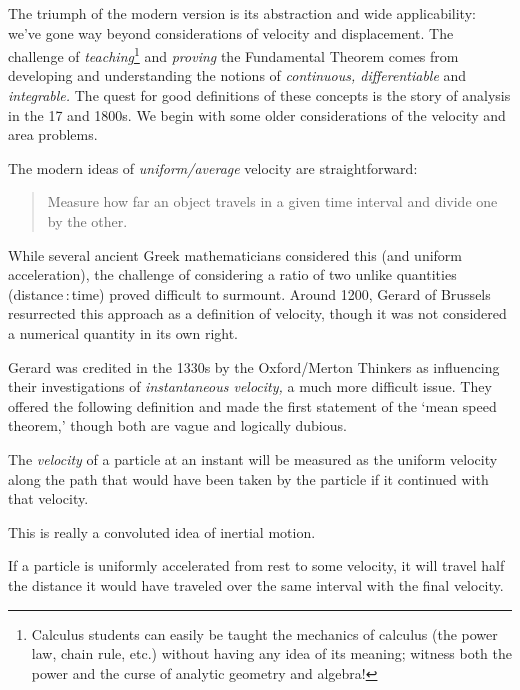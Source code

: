 The triumph of the modern version is its abstraction and wide applicability: we've gone way beyond considerations of velocity and displacement. The challenge of \emph{teaching}\footnote{Calculus students can easily be taught the mechanics of calculus (the power law, chain rule, etc.) without having any idea of its meaning; witness both the power and the curse of analytic geometry and algebra!} and \emph{proving} the Fundamental Theorem comes from developing and understanding the notions of \emph{continuous, differentiable} and \emph{integrable.} The quest for good definitions of these concepts is the story of analysis in the 17 and 1800s. We begin with some older considerations of the velocity and area problems.



The modern ideas of \emph{uniform/average} velocity are straightforward:
\begin{quote}
Measure how far an object travels in a given time interval and divide one by the other.
\end{quote}
While several ancient Greek mathematicians %
considered this (and uniform acceleration), the challenge of considering a ratio of two unlike quantities (distance\,:\,time) proved difficult to surmount. Around 1200, Gerard of Brussels resurrected this approach as a definition of velocity, though it was not  considered a numerical quantity in its own right.\smallbreak

Gerard was credited in the 1330s by the Oxford/Merton Thinkers %
as influencing their investigations of \emph{instantaneous velocity,} a much more difficult issue. They offered the following definition and made the first statement of the `mean speed theorem,' though both are vague and logically dubious.

\begin{defn*}{}{}
The \emph{velocity} of a particle at an instant will be measured as the uniform velocity along the path that would have been taken by the particle if it continued with that velocity.
\end{defn*}

This is really a convoluted idea of inertial motion.

\begin{thm*}{}{}
If a particle is uniformly accelerated from rest to some velocity, it will travel half the distance it would have traveled over the same interval with the final velocity.
\end{thm*}

